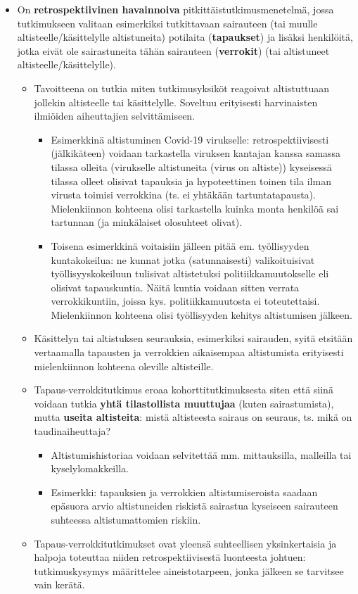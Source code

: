 \documentclass[
]{book}
\providecommand{\tightlist}{%
  \setlength{\itemsep}{0pt}\setlength{\parskip}{0pt}}
\begin{document}
\begin{itemize}
\tightlist
\item
  On \textbf{retrospektiivinen havainnoiva} pitkittäistutkimusmenetelmä, jossa tutkimukseen valitaan esimerkiksi tutkittavaan sairauteen (tai muulle altisteelle/käsittelylle altistuneita) potilaita (\textbf{tapaukset}) ja lisäksi henkilöitä, jotka eivät ole sairastuneita tähän sairauteen (\textbf{verrokit}) (tai altistuneet altisteelle/käsittelylle).

  \begin{itemize}
  \tightlist
  \item
    Tavoitteena on tutkia miten tutkimusyksiköt reagoivat altistuttuaan jollekin altisteelle tai käsittelylle. Soveltuu erityisesti harvinaisten ilmiöiden aiheuttajien selvittämiseen.

    \begin{itemize}
    \tightlist
    \item
      Esimerkkinä altistuminen Covid-19 virukselle: retrospektiivisesti (jälkikäteen) voidaan tarkastella viruksen kantajan kanssa samassa tilassa olleita (virukselle altistuneita (virus on altiste)) kyseisessä tilassa olleet olisivat tapauksia ja hypoteettinen toinen tila ilman virusta toimisi verrokkina (ts. ei yhtäkään tartuntatapausta). Mielenkiinnon kohteena olisi tarkastella kuinka monta henkilöä sai tartunnan (ja minkälaiset olosuhteet olivat).
    \item
      Toisena esimerkkinä voitaisiin jälleen pitää em. työllisyyden kuntakokeilua: ne kunnat jotka (satunnaisesti) valikoituisivat työllisyyskokeiluun tulisivat altistetuksi politiikkamuutokselle eli olisivat tapauskuntia. Näitä kuntia voidaan sitten verrata verrokkikuntiin, joissa kys. politiikkamuutosta ei toteutettaisi. Mielenkiinnon kohteena olisi työllisyyden kehitys altistumisen jälkeen.
    \end{itemize}
  \item
    Käsittelyn tai altistuksen seurauksia, esimerkiksi sairauden, syitä etsitään vertaamalla tapausten ja verrokkien aikaisempaa altistumista erityisesti mielenkiinnon kohteena oleville altisteille.
  \item
    Tapaus-verrokkitutkimus eroaa kohorttitutkimuksesta siten että siinä voidaan tutkia \textbf{yhtä tilastollista muuttujaa} (kuten sairastumista), mutta \textbf{useita altisteita}: mistä altisteesta sairaus on seuraus, ts. mikä on taudinaiheuttaja?

    \begin{itemize}
    \tightlist
    \item
      Altistumishistoriaa voidaan selvitettää mm. mittauksilla, malleilla tai kyselylomakkeilla.
    \item
      Esimerkki: tapauksien ja verrokkien altistumiseroista saadaan epäsuora arvio altistuneiden riskistä sairastua kyseiseen sairauteen suhteessa altistumattomien riskiin.
    \end{itemize}
  \item
    Tapaus-verrokkitutkimukset ovat yleensä suhteellisen yksinkertaisia ja halpoja toteuttaa niiden retrospektiivisestä luonteesta johtuen: tutkimuskysymys määrittelee aineistotarpeen, jonka jälkeen se tarvitsee vain kerätä.


\end{itemize}
\end{itemize}
\end{document}
